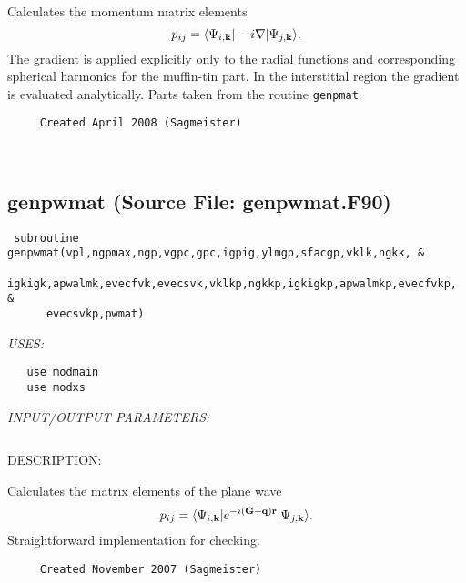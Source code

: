 \documentclass[11pt]{article}
\begin{document}
     Calculates the momentum matrix elements
     $$ p_{ij}=\langle\Psi_{i,{\bf k}}|-i\nabla|\Psi_{j,{\bf k}}\rangle. $$
     The gradient is applied explicitly only to the radial functions and 
     corresponding spherical harmonics for the muffin-tin part. In the 
     interstitial region the gradient is evaluated analytically.
     Parts taken from the routine {\tt genpmat}.
  
\begin{verbatim}     Created April 2008 (Sagmeister)\end{verbatim}


 
 
\mbox{}\hrulefill\ 
 
\subsection{genpwmat (Source File: genpwmat.F90)}


\begin{verbatim} subroutine genpwmat(vpl,ngpmax,ngp,vgpc,gpc,igpig,ylmgp,sfacgp,vklk,ngkk, &
      igkigk,apwalmk,evecfvk,evecsvk,vklkp,ngkkp,igkigkp,apwalmkp,evecfvkp, &
      evecsvkp,pwmat)\end{verbatim}{\em USES:}
\begin{verbatim}   use modmain
   use modxs\end{verbatim}{\em INPUT/OUTPUT PARAMETERS:}
\begin{verbatim} \end{verbatim}
{\sf DESCRIPTION:\\ }

    Calculates the matrix elements of the plane wave
     $$ p_{ij}=\langle\Psi_{i,{\bf k}}|e^{-i({\bf G}+{\bf q}){\bf r}}|
        \Psi_{j,{\bf k}}\rangle. $$
    Straightforward implementation for checking.
  
\begin{verbatim}     Created November 2007 (Sagmeister)\end{verbatim}



\end{document}

